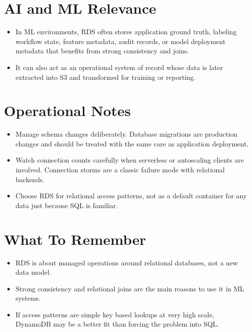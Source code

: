 \documentclass[10pt,twocolumn]{article}
\begin{document}
\section*{AI and ML Relevance}
\begin{itemize}
\item In ML environments, RDS often stores application ground truth, labeling workflow state, feature metadata, audit records, or model deployment metadata that benefits from strong consistency and joins.
\item It can also act as an operational system of record whose data is later extracted into S3 and transformed for training or reporting.
\end{itemize}

\section*{Operational Notes}
\begin{itemize}
\item Manage schema changes deliberately. Database migrations are production changes and should be treated with the same care as application deployment.
\item Watch connection counts carefully when serverless or autoscaling clients are involved. Connection storms are a classic failure mode with relational backends.
\item Choose RDS for relational access patterns, not as a default container for any data just because SQL is familiar.
\end{itemize}

\section*{What To Remember}
\begin{itemize}
\item RDS is about managed operations around relational databases, not a new data model.
\item Strong consistency and relational joins are the main reasons to use it in ML systems.
\item If access patterns are simple key based lookups at very high scale, DynamoDB may be a better fit than forcing the problem into SQL.
\end{itemize}
\end{document}
